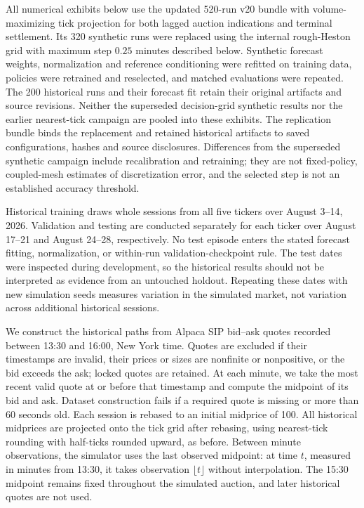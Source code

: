 \documentclass[11pt]{article}
\begin{document}
All numerical exhibits below use the updated 520-run v20 bundle with volume-maximizing tick projection for both lagged auction indications and terminal settlement. Its 320 synthetic runs were replaced using the internal rough-Heston grid with maximum step $0.25$ minutes described below. Synthetic forecast weights, normalization and reference conditioning were refitted on training data, policies were retrained and reselected, and matched evaluations were repeated. The 200 historical runs and their forecast fit retain their original artifacts and source revisions. Neither the superseded decision-grid synthetic results nor the earlier nearest-tick campaign are pooled into these exhibits. The replication bundle binds the replacement and retained historical artifacts to saved configurations, hashes and source disclosures. Differences from the superseded synthetic campaign include recalibration and retraining; they are not fixed-policy, coupled-mesh estimates of discretization error, and the selected step is not an established accuracy threshold.\vspace{0.5em}

Historical training draws whole sessions from all five tickers over August 3--14, 2026. Validation and testing are conducted separately for each ticker over August 17--21 and August 24--28, respectively. No test episode enters the stated forecast fitting, normalization, or within-run validation-checkpoint rule. The test dates were inspected during development, so the historical results should not be interpreted as evidence from an untouched holdout. Repeating these dates with new simulation seeds measures variation in the simulated market, not variation across additional historical sessions.\vspace{0.5em}

\begingroup
We construct the historical paths from Alpaca SIP bid--ask quotes recorded between 13:30 and 16:00, New York time. Quotes are excluded if their timestamps are invalid, their prices or sizes are nonfinite or nonpositive, or the bid exceeds the ask; locked quotes are retained. At each minute, we take the most recent valid quote at or before that timestamp and compute the midpoint of its bid and ask. Dataset construction fails if a required quote is missing or more than 60 seconds old. Each session is rebased to an initial midprice of 100. All historical midprices are projected onto the tick grid after rebasing, using nearest-tick rounding with half-ticks rounded upward, as before. Between minute observations, the simulator uses the last observed midpoint: at time $t$, measured in minutes from 13:30, it takes observation $\lfloor t\rfloor$ without interpolation. The 15:30 midpoint remains fixed throughout the simulated auction, and later historical quotes are not used.\vspace{0.5em}
\endgroup
\end{document}
